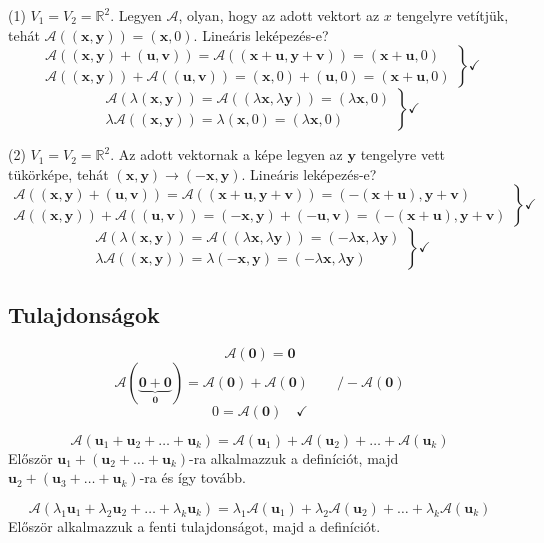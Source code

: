 \documentclass[a4paper,12pt,twoside]{book}
\newcommand{\vek}[1]{\mathbf{#1}} %
\newcommand{\linkomb}[3]{#2_1\vek{#1}_{1} + #2_2\vek{#1}_{2} + \ldots + #2_{#3}\vek{#1}_{#3}}
\newcommand{\R}{\mathbb{R}}
\theoremstyle{break}
\begin{document}
(1) $V_1 = V_2 = \R^2$. Legyen $\mathcal{A}$, olyan, hogy az adott vektort az $x$ tengelyre vetítjük, tehát $\mathcal{A}((\vek{x},\vek{y})) = (\vek{x},0)$. Lineáris leképezés-e?
\[\left.\begin{array}{r}
\mathcal{A}((\vek{x},\vek{y})+(\vek{u},\vek{v})) = \mathcal{A}((\vek{x}+\vek{u}, \vek{y}+\vek{v})) = (\vek{x}+\vek{u}, 0) \\
\mathcal{A}((\vek{x},\vek{y}))+\mathcal{A}((\vek{u},\vek{v}))=(\vek{x},0)+(\vek{u},0)=(\vek{x}+\vek{u},0)   
  \end{array}\right\} \checkmark\]
\[\left.\begin{array}{r}
\mathcal{A}(\lambda(\vek{x},\vek{y})) = \mathcal{A}((\lambda \vek{x}, \lambda \vek{y})) = (\lambda \vek{x}, 0) \\
\lambda \mathcal{A}((\vek{x},\vek{y}))=\lambda (\vek{x},0)=(\lambda \vek{x},0)   
  \end{array}\right\} \checkmark\]

(2) $V_1 = V_2 = \R^2$. Az adott vektornak a képe legyen az $\vek{y}$ tengelyre vett tükörképe, tehát $(\vek{x},\vek{y}) \rightarrow (-\vek{x},\vek{y})$. Lineáris leképezés-e?
\[\left.\begin{array}{r}
\mathcal{A}((\vek{x},\vek{y})+(\vek{u},\vek{v})) = \mathcal{A}((\vek{x}+\vek{u}, \vek{y}+\vek{v})) = (-(\vek{x}+\vek{u}), \vek{y}+\vek{v}) \\
\mathcal{A}((\vek{x},\vek{y}))+\mathcal{A}((\vek{u},\vek{v}))=(-\vek{x},\vek{y})+(-\vek{u},\vek{v}) = (-(\vek{x}+\vek{u}),\vek{y}+\vek{v})   
  \end{array}\right\} \checkmark\]
\[\left.\begin{array}{r}
\mathcal{A}(\lambda(\vek{x},\vek{y})) = \mathcal{A}((\lambda \vek{x}, \lambda \vek{y})) = (-\lambda \vek{x}, \lambda \vek{y}) \\
\lambda \mathcal{A}((\vek{x},\vek{y}))=\lambda (-\vek{x},\vek{y})=(-\lambda \vek{x},\lambda \vek{y})   
  \end{array}\right\} \checkmark\]

\subsection{Tulajdonságok}

\begin{enumerate*}
 \item \[\mathcal{A}(\vek{0}) = \vek{0}\]
  \[\mathcal{A}(\underbrace{\vek{0}+\vek{0}}_{\vek{0}}) = \mathcal{A}(\vek{0})+\mathcal{A}(\vek{0}) \qquad /-\mathcal{A}(\vek{0})\]
  \[0 = \mathcal{A}(\vek{0}) \quad \checkmark\]
 \item \[\mathcal{A}(\vek{u}_1+\vek{u}_2+\ldots+\vek{u}_k) = \mathcal{A}(\vek{u}_1)+\mathcal{A}(\vek{u}_2)+\ldots+\mathcal{A}(\vek{u}_k)\]
  Először $\vek{u}_1 + (\vek{u}_2+\ldots+\vek{u}_k)$-ra alkalmazzuk a definíciót, majd $\vek{u}_2 + (\vek{u}_3+\ldots+\vek{u}_k)$-ra és így tovább.
 \item \[\mathcal{A}(\linkomb{u}{\lambda}{k}) = \lambda_1\mathcal{A}(\vek{u}_1)+\lambda_2\mathcal{A}(\vek{u}_2)+\ldots+\lambda_k\mathcal{A}(\vek{u}_k)\]
 Először alkalmazzuk a fenti tulajdonságot, majd a definíciót.
\end{enumerate*}
\end{document}
